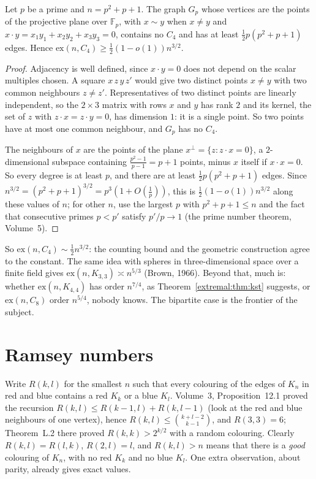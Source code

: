 \begin{theorem}\label{extremal:thm:polarity}
Let $p$ be a prime and $n=p^2+p+1$. The graph $G_p$ whose vertices are the points of the projective plane over $\mathbb F_p$, with $x\sim y$ when $x\ne y$ and
$x\cdot y=x_1y_1+x_2y_2+x_3y_3=0$, contains no $C_4$ and has at least $\frac12p(p^2+p+1)$ edges. Hence $\mathrm{ex}(n,C_4)\ge\frac12(1-o(1))n^{3/2}$.
\end{theorem}
\begin{proof}
Adjacency is well defined, since $x\cdot y=0$ does not depend on the scalar multiples chosen. A square $x\,z\,y\,z'$ would give two distinct points
$x\neq y$ with two common neighbours $z\ne z'$. Representatives of two distinct points are linearly independent, so the $2\times3$ matrix with rows $x$
and $y$ has rank $2$ and its kernel, the set of $z$ with $z\cdot x=z\cdot y=0$, has dimension $1$: it is a single point. So two points have at most one common
neighbour, and $G_p$ has no $C_4$.

The neighbours of $x$ are the points of the plane $x^\perp=\{z:z\cdot x=0\}$, a $2$-dimensional subspace containing $\frac{p^2-1}{p-1}=p+1$ points, minus $x$
itself if $x\cdot x=0$. So every degree is at least $p$, and there are at least $\frac12p(p^2+p+1)$ edges. Since $n^{3/2}=(p^2+p+1)^{3/2}=p^3(1+O(\frac1p))$, this is
$\frac12(1-o(1))n^{3/2}$ along these values of $n$; for other $n$, use the largest $p$ with $p^2+p+1\le n$ and the fact that consecutive primes $p<p'$ satisfy
$p'/p\to1$ (the prime number theorem, Volume~5).
\end{proof}

So $\mathrm{ex}(n,C_4)\sim\frac12n^{3/2}$: the counting bound and the geometric construction agree to the constant. The same idea with spheres in
three-dimensional space over a finite field gives $\mathrm{ex}(n,K_{3,3})\asymp n^{5/3}$ (Brown, 1966). Beyond that, much is: whether $\mathrm{ex}(n,K_{4,4})$ has order $n^{7/4}$, as Theorem~\ref{extremal:thm:kst} suggests, or $\mathrm{ex}(n,C_8)$ order $n^{5/4}$, nobody knows. The bipartite
case is the frontier of the subject.

\section{Ramsey numbers}

Write $R(k,l)$ for the smallest $n$ such that every colouring of the edges of $K_n$ in red and blue contains a red $K_k$ or a blue $K_l$. Volume~3, Proposition~12.1
proved the recursion $R(k,l)\le R(k-1,l)+R(k,l-1)$ (look at the red and blue neighbours of one vertex), hence $R(k,l)\le\binom{k+l-2}{k-1}$, and $R(3,3)=6$; Theorem~L.2 there
proved $R(k,k)>2^{k/2}$ with a random colouring. Clearly $R(k,l)=R(l,k)$, $R(2,l)=l$, and $R(k,l)>n$ means that there is a \emph{good} colouring of $K_n$, with no red
$K_k$ and no blue $K_l$. One extra observation, about parity, already gives exact values.

